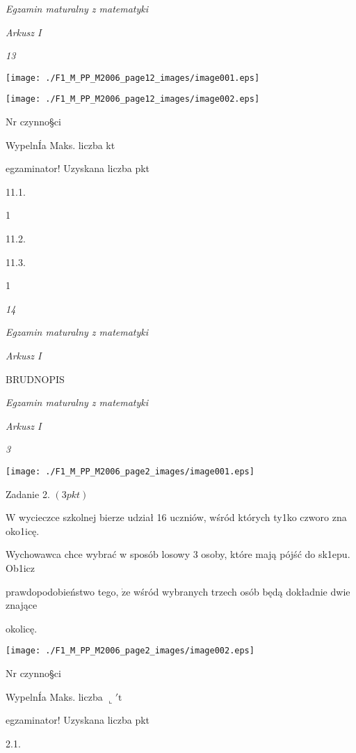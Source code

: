 \documentclass[a4paper,12pt]{article}
\begin{document}
{\it Egzamin maturalny z matematyki}

{\it Arkusz I}

{\it 13}
\begin{center}
\texttt{[image: ./F1\_M\_PP\_M2006\_page12\_images/image001.eps]}

\texttt{[image: ./F1\_M\_PP\_M2006\_page12\_images/image002.eps]}
\end{center}
Nr czynno\S ci

WypelnÍa Maks. liczba kt

egzaminator! Uzyskana liczba pkt

11.1.

1

11.2.

11.3.

1





{\it 14}

{\it Egzamin maturalny z matematyki}

{\it Arkusz I}

BRUDNOPIS





{\it Egzamin maturalny z matematyki}

{\it Arkusz I}

{\it 3}
\begin{center}
\texttt{[image: ./F1\_M\_PP\_M2006\_page2\_images/image001.eps]}
\end{center}
Zadanie 2. $(3pkt)$

$\mathrm{W}$ wycieczce szkolnej bierze udział 16 uczniów, wśród których ty1ko czworo zna oko1icę.

Wychowawca chce wybrać w sposób losowy 3 osoby, które mają pójść do sk1epu. Ob1icz

prawdopodobieństwo tego, $\dot{\mathrm{z}}\mathrm{e}$ wśród wybranych trzech osób będą dokładnie dwie znające

okolicę.
\begin{center}
\texttt{[image: ./F1\_M\_PP\_M2006\_page2\_images/image002.eps]}
\end{center}
Nr czynno\S ci

WypelnÍa Maks. liczba $\llcorner\prime \mathrm{t}$

egzaminator! Uzyskana liczba pkt

2.1.
\end{document}
